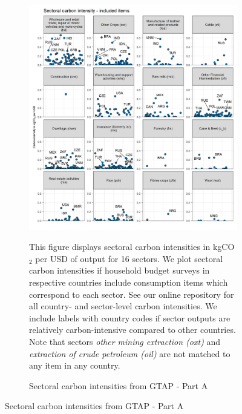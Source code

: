 \begin{figure}[ht!]
  \centering
  \caption{Sectoral carbon intensities from GTAP} \label{fig:GTAP}\label{fig:B}
  \begin{subfigure}[b]{\textwidth}
  \centering
  \caption{Sectoral carbon intensities from GTAP - Part A} \label{fig:B1}  \includegraphics{Analysis_Carbon_Intensities_GTAP/Figure_2.1.1_A_2017}
  \begin{subcaption2}
    This figure displays sectoral carbon intensities in kgCO$_{2}$ per USD of output for 16 sectors. We plot sectoral carbon intensities if household budget surveys in respective countries include consumption items which correspond to each sector. See our online repository for all country- and sector-level carbon intensities. We include labels with country codes if sector outputs are relatively carbon-intensive compared to other countries. Note that sectors \textit{other mining extraction (oxt)} and \textit{extraction of crude petroleum (oil)} are not matched to any item in any country.
  \end{subcaption2}
\end{subfigure}
\end{figure}

\clearpage

